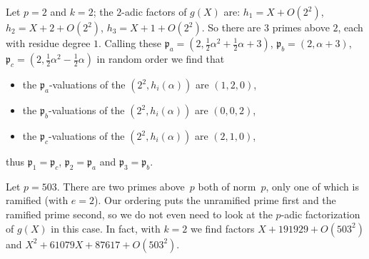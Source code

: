 \documentclass{article}
\def\p{{\mathfrak p}}
\begin{document}
Let $p=2$ and $k=2$; the $2$-adic factors of $g(X)$ are: $h_1=X+O(2^2)$,
$h_2=X+2+O(2^2)$, $h_3=X+1+O(2^2)$.  So there are $3$
primes above $2$, each with residue degree $1$.
Calling these $\p_a = (2,\frac 12\alpha^2+\frac 12\alpha+3)$, $\p_b =
(2,\alpha+3)$, $\p_c = (2,\frac 12\alpha^2-\frac 12\alpha)$ in random order we find that
\begin{itemize}
  \item the $\p_a$-valuations of the $(2^2,h_i(\alpha))$ are $(1,2,0)$,
  \item the $\p_b$-valuations of the $(2^2,h_i(\alpha))$ are $(0,0,2)$,
  \item the $\p_c$-valuations of the $(2^2,h_i(\alpha))$ are $(2,1,0)$,
\end{itemize}
thus $\p_1=\p_c$, $\p_2=\p_a$ and $\p_3=\p_b$.

Let $p=503$.  There are two primes above~$p$ both of norm~$p$, only
one of which is ramified (with $e=2$). Our ordering puts the
unramified prime first and the ramified prime second, so we do not even need to
look at the $p$-adic factorization of $g(X)$ in this case.  In fact,
with $k=2$ we find factors $X+191929+O(503^2)$ and $X^2+61079X+87617+O(503^2)$.
\end{document}

